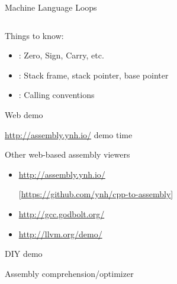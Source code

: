 \documentclass[english,compress]{beamer}
\begin{document}
\begin{frame}{Machine Language Loops}
  \begin{columns}
    
    
  \end{columns}

  Things to know:
  \begin{itemize}
  \item
  : Zero, Sign, Carry, etc.
  \item {}:
    Stack frame, stack pointer, base pointer
  \item
  :
    Calling conventions
  \end{itemize}
\end{frame}
\begin{frame}{Web demo}
  \begin{center}
  \Huge \url{http://assembly.ynh.io/} demo time
  \end{center}
\end{frame}
\begin{frame}{Other web-based assembly viewers}
  \begin{itemize}
    \item \url{http://assembly.ynh.io/}

      [\url{https://github.com/ynh/cpp-to-assembly}]
    \item \url{http://gcc.godbolt.org/}

    \item \url{http://llvm.org/demo/}
  \end{itemize}
\end{frame}
\begin{frame}{DIY demo}
  \begin{center}
  \Huge Assembly comprehension/optimizer
  \end{center}
\end{frame}
\end{document}
